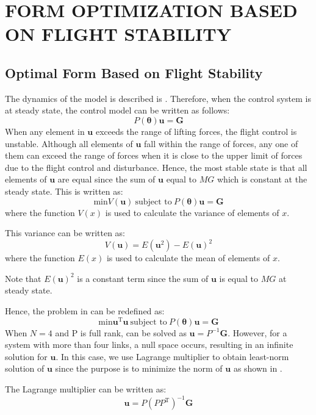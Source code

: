 \section{FORM OPTIMIZATION BASED ON FLIGHT STABILITY}
\subsection{Optimal Form Based on Flight Stability}
The dynamics of the model is described is . Therefore, when the control system is at steady state, the control model can be written as follows:
\begin{equation}
  P(\bm{\theta})\bm{u}=\bm{G}
  \label{eq:steady_state}
\end{equation}
When any element in $\bm{u}$ exceeds the range of lifting forces, the flight control is unstable. Although all elements of $\bm{u}$ fall within the range of forces, any one of them can exceed the range of forces when it is close to the upper limit of forces due to the flight control and disturbance. Hence, the most stable state is that all elements of $\bm{u}$ are equal since the sum of $\bm{u}$ equal to $MG$ which is constant at the steady state. This is written as:
\begin{equation}
  \text{min} V(\bm{u}) \ \text{subject to} \ P(\bm{\theta})\bm{u}=\bm{G}
  \label{eq:optimization}
\end{equation}
where the function $V(x)$ is used to calculate the variance of elements of $x$. 
\par
This variance can be written as:
\begin{equation}
  V(\bm{u})=E(\bm{u}^2)-E(\bm{u})^2
\end{equation}
where the function $E(x)$ is used to calculate the mean of elements of $x$. 
\par
Note that $E(\bm{u})^2$ is a constant term since the sum of $\bm{u}$ is equal to $MG$ at steady state.
\par
Hence, the problem in  can be redefined as:
\begin{equation}
  \text{min}\bm{u}^\mathrm{T}\bm{u} \ \text{subject to} \ P(\bm{\theta})\bm{u}=\bm{G}
  \label{eq:optimization2}
\end{equation}
When $N=4$ and P is full rank,  can be solved as $\bm{u}=P^{-1}\bm{G}$. However, for a system with more than four links, a null space occurs, resulting in an infinite solution for $\bm{u}$. In this case, we use Lagrange multiplier to obtain least-norm solution of $\bm{u}$ since the purpose is to minimize the norm of $\bm{u}$ as shown in . 
\par
The Lagrange multiplier can be written as:
\begin{equation}
  \bm{u}=P(PP^\mathrm{T})^{-1}\bm{G}
  \label{eq:P_inv}
\end{equation}

